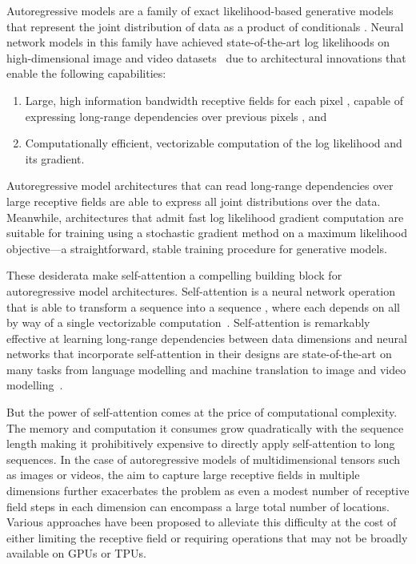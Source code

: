 \documentclass{article} \usepackage{iclr2020_conference,times}
\begin{document}
Autoregressive models are a family of exact likelihood-based generative models that represent the joint distribution of data  as a product of conditionals .
Neural network models in this family have achieved state-of-the-art log likelihoods on high-dimensional image and video datasets~\citep{oord2016pixel,chen2018pixelsnail,menick2018generating,parmar2018image,child2019generating,weissenborn2019scaling,salimans2017pixelcnn++,kalchbrenner2017video,uria2016neural,parikh2016decomposable,theis2015generative,oord2016conditional} due to architectural innovations that enable the following capabilities:
\begin{enumerate}
    \item Large, high information bandwidth receptive fields for each pixel , capable of expressing long-range dependencies over previous pixels , and
    \item Computationally efficient, vectorizable computation of the log likelihood and its gradient.
\end{enumerate}
Autoregressive model architectures that can read long-range dependencies over large receptive fields are able to express all joint distributions over the data. Meanwhile, architectures that admit fast log likelihood gradient computation are suitable for training using a stochastic gradient method on a maximum likelihood objective---a straightforward, stable training procedure for generative models.

These desiderata make self-attention a compelling building block for autoregressive model architectures. Self-attention is a neural network operation that is able to transform a sequence  into a sequence , where each  depends on all  by way of a single vectorizable computation~\citep{vaswani2017attention}. Self-attention is remarkably effective at learning long-range dependencies between data dimensions and neural networks that incorporate self-attention in their designs are state-of-the-art on many tasks from language modelling and machine translation to image and video modelling~\citep{parmar2018image,child2019generating}.

But the power of self-attention comes at the price of computational complexity. The memory and computation it consumes grow quadratically with the sequence length  making it prohibitively expensive to directly apply self-attention to long sequences. In the case of autoregressive models of multidimensional tensors such as images or videos, the aim to capture large receptive fields in multiple dimensions further exacerbates the problem as even a modest number of receptive field steps in each dimension can encompass a large total number of locations. Various approaches have been proposed to alleviate this difficulty at the cost of either limiting the receptive field or requiring operations that may not be broadly available on GPUs or TPUs.
\end{document}
